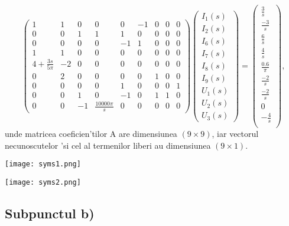 \documentclass[titlepage, a4paper,12pt]{article}
\begin{document}
\[ \left( \begin{array}{ccccccccc}
1 & 1 & 0 & 0 & 0 & -1 & 0 & 0 & 0 \\
0 & 0 & 1 & 1 & 1 & 0 & 0 & 0 & 0 \\
0 & 0 & 0 & 0 & -1 & 1 & 0 & 0 & 0 \\
1 & 1 & 0 & 0 & 0 & 0 & 0 & 0 & 0 \\
4 + \frac{3s}{5\pi} & -2 & 0 & 0 & 0 & 0 & 0 & 0 & 0 \\
0 & 2 & 0 & 0 & 0 & 0 & 1 & 0 & 0 \\
0 & 0 & 0 & 0 & 1 & 0 & 0 & 0 & 1 \\
0 & 0 & 1 & 0 & -1 & 0 & 1 & 1 & 0 \\
0 & 0 & -1 & \frac{10000\pi}{s} & 0 & 0 & 0 & 0 & 0 
\end{array} \right)
%
\left( \begin{array}{c}
I_1(s) \\
I_2(s) \\
I_6(s) \\
I_7(s) \\
I_8(s) \\
I_9(s) \\
U_1(s) \\
U_2(s) \\
U_3(s)
\end{array} \right)
=
\left( \begin{array}{c}
\frac{3}{s} \\
\frac{-3}{s} \\
\frac{6}{s} \\
\frac{4}{s} \\
\frac{0.6}{\pi} \\
\frac{-2}{s} \\
\frac{-2}{s} \\
0 \\
-\frac{4}{s} \\
\end{array} \right),
\]
unde matricea coeficien'tilor A are dimensiunea $(9\times9)$, iar vectorul necunoscutelor 'si cel al termenilor liberi au dimensiunea $(9\times1)$.\newline

\begin{center}
\texttt{[image: syms1.png]}
\end{center}

\begin{center}
\texttt{[image: syms2.png]}
\end{center}

\subsection{Subpunctul b)} \mbox{}
\end{document}
